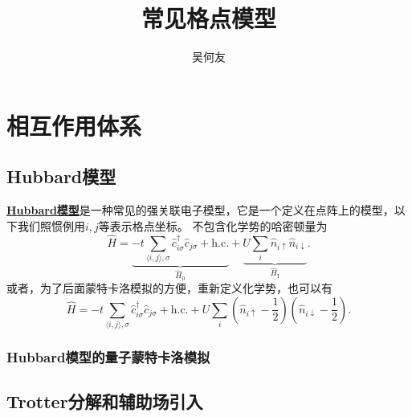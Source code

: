 \documentclass[hyperref, UTF8, a4paper]{ctexart}
\title{常见格点模型}
\author{吴何友}
\newcommand*{\pair}[1]{\langle #1 \rangle}
\newcommand*{\concept}[1]{\underline{\textbf{#1}}}
\begin{document}
\maketitle

\section{相互作用体系}

\subsection{Hubbard模型}

\concept{Hubbard模型}是一种常见的强关联电子模型，它是一个定义在点阵上的模型，以下我们照惯例用$i, j$等表示格点坐标。
不包含化学势的哈密顿量为
\begin{equation}
    \hat{H} = \underbrace{-t \sum_{\pair{i, j}, \sigma} \hat{c}_{i\sigma}^\dagger \hat{c}_{j\sigma} + \text{h.c.}}_{\hat{H}_0} + \underbrace{U \sum_i \hat{n}_{i \uparrow} \hat{n}_{i \downarrow}}_{\hat{H}_\text{I}}.
\end{equation}
或者，为了后面蒙特卡洛模拟的方便，重新定义化学势，也可以有
\begin{equation}
    \hat{H} = -t \sum_{\pair{i, j}, \sigma} \hat{c}_{i\sigma}^\dagger \hat{c}_{j\sigma} + \text{h.c.} 
    + U \sum_i \left(\hat{n}_{i\uparrow} - \frac{1}{2}\right) \left(\hat{n}_{i\downarrow} - \frac{1}{2}\right).
\end{equation}

\subsubsection{Hubbard模型的量子蒙特卡洛模拟}

\subsection{Trotter分解和辅助场引入}
\end{document}
